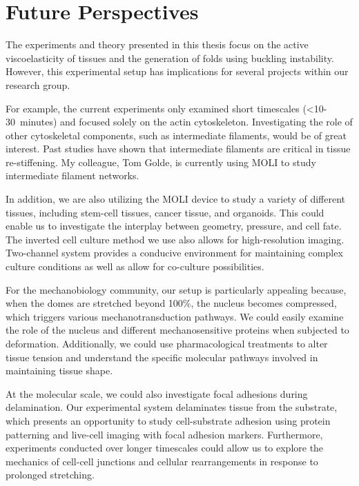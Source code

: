 \newpage
\hypertarget{future-perspectives}{%
	\section{Future Perspectives}\label{future-perspectives}}

The experiments and theory presented in this thesis focus on the active viscoelasticity of tissues and the generation of folds using buckling instability. However, this experimental setup has implications for several projects within our research group.

For example, the current experiments only examined short timescales (<10-30~minutes) and focused solely on the actin cytoskeleton. Investigating the role of other cytoskeletal components, such as intermediate filaments, would be of great interest. Past studies have shown that intermediate filaments are critical in tissue re-stiffening. My colleague, Tom Golde, is currently using MOLI to study intermediate filament networks.

In addition, we are also utilizing the MOLI device to study a variety of different tissues, including stem-cell tissues, cancer tissue, and organoids. This could enable us to investigate the interplay between geometry, pressure, and cell fate. The inverted cell culture method we use also allows for high-resolution imaging. Two-channel system provides a conducive environment for maintaining complex culture conditions as well as allow for co-culture possibilities.

For the mechanobiology community, our setup is particularly appealing because, when the domes are stretched beyond 100\%, the nucleus becomes compressed, which triggers various mechanotransduction pathways. We could easily examine the role of the nucleus and different mechanosensitive proteins when subjected to deformation. Additionally, we could use pharmacological treatments to alter tissue tension and understand the specific molecular pathways involved in maintaining tissue shape.

At the molecular scale, we could also investigate focal adhesions during delamination. Our experimental system delaminates tissue from the substrate, which presents an opportunity to study cell-substrate adhesion using protein patterning and live-cell imaging with focal adhesion markers. Furthermore, experiments conducted over longer timescales could allow us to explore the mechanics of cell-cell junctions and cellular rearrangements in response to prolonged stretching.

